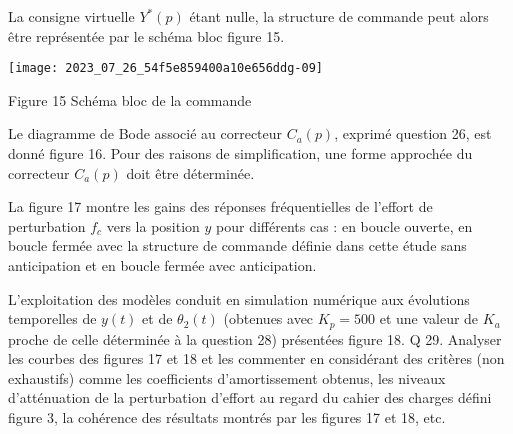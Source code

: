 La consigne virtuelle $Y^{*}(p)$ étant nulle, la structure de commande peut alors être représentée par le schéma bloc figure 15.

\begin{center}
\texttt{[image: 2023\_07\_26\_54f5e859400a10e656ddg-09]}
\end{center}

Figure 15 Schéma bloc de la commande




Le diagramme de Bode associé au correcteur $C_{a}(p)$, exprimé question 26, est donné figure 16. Pour des raisons de simplification, une forme approchée du correcteur $C_{a}(p)$ doit être déterminée.


La figure 17 montre les gains des réponses fréquentielles de l'effort de perturbation $f_{c}$ vers la position $y$ pour différents cas : en boucle ouverte, en boucle fermée avec la structure de commande définie dans cette étude sans anticipation et en boucle fermée avec anticipation.

L'exploitation des modèles conduit en simulation numérique aux évolutions temporelles de $y(t)$ et de $\theta_{2}(t)$ (obtenues avec $K_{p}=500$ et une valeur de $K_{a}$ proche de celle déterminée à la question 28) présentées figure 18. Q 29. Analyser les courbes des figures 17 et 18 et les commenter en considérant des critères (non exhaustifs) comme les coefficients d'amortissement obtenus, les niveaux d'atténuation de la perturbation d'effort au regard du cahier des charges défini figure 3, la cohérence des résultats montrés par les figures 17 et 18, etc.

